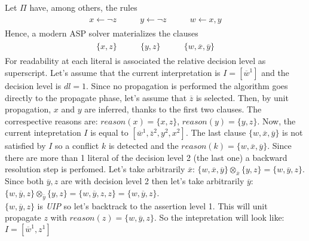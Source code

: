 \begin{example}\label{ex:unit-propagation}
    Let $\Pi$ have, among others, the rules
    \begin{align*}
        \begin{array}{ccc}
            x \leftarrow \neg z \qquad &
            y \leftarrow \neg z \qquad &
            w \leftarrow x, y
        \end{array}
    \end{align*}
    Hence, a modern ASP solver materializes the clauses
    \begin{align*}
        \begin{array}{ccc}
            \{x,z\} \qquad &
            \{y,z\} \qquad &
            \{w,\overline{x},\overline{y}\}
        \end{array}
    \end{align*}
    For readability at each literal is associated the relative decision level 
    as superscript.
    Let's assume that the current interpretation is 
    $I = [\overline{w}^1]$ and the decision level is $dl= 1$.
    Since no propagation is performed the algorithm goes 
    directly to the propagate phase, let's assume that 
    $\overline{z}$ is selected.
    Then, by unit propagation, $x$ and $y$ are inferred,
    thanks to the first two clauses.
    The correspective reasons are: $reason(x) = \{ x, z \}$,
    $reason(y) = \{ y, z \}$.
    Now, the current intepretation $I$ is equal to
    $[\overline{w}^1,\overline{z}^2, y^2, x^2]$.
    The last clause $\{w,\overline{x},\overline{y}\}$
    is not satisfied by $I$ so a conflict $k$ is detected and the 
    $reason(k) = \{w,\overline{x},\overline{y}\}$.
    Since there are more than 1 literal of the decision level 2 (the last one)
    a backward resolution step is perfomed.
    Let's take arbitrarily $\overline{x}$:
    $\{w,\overline{x},\overline{y}\} \otimes_{\overline{x}} \{y,z\} = \{w, \overline{y}, z\}$.
    Since both $\overline{y}, z$ are with decision level 2 then let's take arbitrarily $\overline{y}$:
    $\{w, \overline{y}, z\} \otimes_{\overline{y}} \{y,z\} = \{w, \overline{y}, z, z\} = 
    \{w, \overline{y}, z\}$.\\
    $\{w, \overline{y}, z\}$ is \textit{UIP} so let's backtrack to the assertion level 1.
    This will unit propagate $z$ with $reason(z) = \{w, \overline{y}, z\}$.
    So the intepretation will look like: $I = [\overline{w}^1, z^1]$
\end{example}




